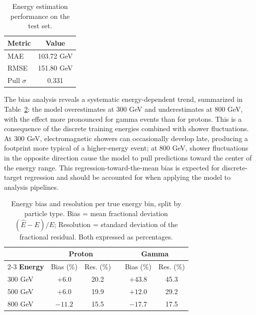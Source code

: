 \begin{table}[ht!]
\centering
\caption[Energy estimation metrics on the test set.]{Energy estimation performance on the test set.}
\label{tab:energy_metrics}
\setlength{\tabcolsep}{11pt}
\renewcommand{\arraystretch}{1.15}
\begin{tabular}{lc}
\toprule
\textbf{Metric} & \textbf{Value} \\
\midrule
MAE  & 103.72 GeV \\
RMSE & 151.80 GeV \\
Pull $\sigma$ & 0.331 \\
\bottomrule
\end{tabular}
\end{table}

The bias analysis reveals a systematic energy-dependent trend, summarized in Table~\ref{tab:energy_stratified}: the model overestimates at 300 GeV and underestimates at 800 GeV, with the effect more pronounced for gamma events than for protons. This is a consequence of the discrete training energies combined with shower fluctuations. At 300 GeV, electromagnetic showers can occasionally develop late, producing a footprint more typical of a higher-energy event; at 800 GeV, shower fluctuations in the opposite direction cause the model to pull predictions toward the center of the energy range. This regression-toward-the-mean bias is expected for discrete-target regression and should be accounted for when applying the model to analysis pipelines.

\begin{table}[ht!]
\centering
\caption[Energy bias and resolution split by particle type.]{Energy bias and resolution per true energy bin, split by particle type. Bias = mean fractional deviation $(\hat{E}-E)/E$; Resolution = standard deviation of the fractional residual. Both expressed as percentages.}
\label{tab:energy_stratified}
\setlength{\tabcolsep}{8pt}
\renewcommand{\arraystretch}{1.2}
\begin{tabular}{lccccc}
\toprule
 & \multicolumn{2}{c}{\textbf{Proton}} & & \multicolumn{2}{c}{\textbf{Gamma}} \\
\cmidrule{2-3} \cmidrule{5-6}
\textbf{Energy} & Bias (\%) & Res. (\%) & & Bias (\%) & Res. (\%) \\
\midrule
300 GeV & $+6.0$  & 20.2 & & $+43.8$ & 45.3 \\
500 GeV & $+6.0$  & 19.9 & & $+12.0$ & 29.2 \\
800 GeV & $-11.2$ & 15.5 & & $-17.7$ & 17.5 \\
\bottomrule
\end{tabular}
\end{table}

